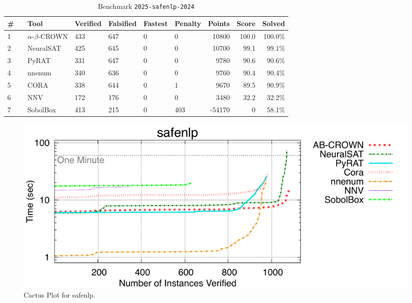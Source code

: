 \begin{table}[h]
\begin{center}
\caption{Benchmark \texttt{2025-safenlp-2024}} \label{tab:cat_2025_safenlp_2024}
{\setlength{\tabcolsep}{2pt}
\begin{tabular}[h]{@{}llllllrrr@{}}
\toprule
\textbf{\# ~} & \textbf{Tool} & \textbf{Verified} & \textbf{Falsified} & \textbf{Fastest} & \textbf{Penalty} & \textbf{Points} & \textbf{Score} & \textbf{Solved}\\
\midrule
1 & $\alpha$-$\beta$-CROWN & 433 & 647 & 0 & 0 & 10800 & 100.0 & 100.0\% \\
2 & NeuralSAT & 425 & 645 & 0 & 0 & 10700 & 99.1 & 99.1\% \\
3 & PyRAT & 331 & 647 & 0 & 0 & 9780 & 90.6 & 90.6\% \\
4 & nnenum & 340 & 636 & 0 & 0 & 9760 & 90.4 & 90.4\% \\
5 & CORA & 338 & 644 & 0 & 1 & 9670 & 89.5 & 90.9\% \\
6 & NNV & 172 & 176 & 0 & 0 & 3480 & 32.2 & 32.2\% \\
7 & SobolBox & 413 & 215 & 0 & 403 & -54170 & 0 & 58.1\% \\
\bottomrule
\end{tabular}
}
\end{center}
\end{table}



\begin{figure}[h]
\centerline{\includegraphics[width=\textwidth]{cactus/2025_safenlp_2024.pdf}}
\caption{Cactus Plot for safenlp.}
\label{fig:quantPic}
\end{figure}


\clearpage


